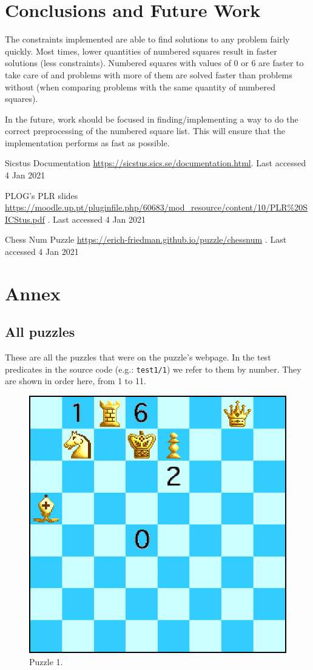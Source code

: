 \documentclass[runningheads]{llncs}
\newcommand{\inlinecode}[1]{\texttt{#1}}
\begin{document}
\section{Conclusions and Future Work}
The constraints implemented are able to find solutions to any problem fairly
quickly. Most times, lower quantities of numbered squares result in faster
solutions (less constraints). Numbered squares with values of 0 or 6 are
faster to take care of and problems with more of them are solved faster than
problems without (when comparing problems with the same quantity of numbered squares).

In the future, work should be focused in finding/implementing a way to do the
correct preprocessing of the numbered square list. This will ensure that the
implementation performs as fast as possible.

\begin{thebibliography}{8}
    Sicstus Documentation
        \href{https://sicstus.sics.se/documentation.html}{https://sicstus.sics.se/documentation.html}.
        Last accessed 4 Jan 2021

    PLOG's PLR slides 
    \href{https://moodle.up.pt/pluginfile.php/60683/mod\_resource/content/10/PLR\%20SICStus.pdf}{https://moodle.up.pt/pluginfile.php/60683/mod\_resource/content/10/PLR\%20SICStus.pdf}
    . Last accessed 4 Jan 2021

    Chess Num Puzzle 
    \href{https://erich-friedman.github.io/puzzle/chessnum}{https://erich-friedman.github.io/puzzle/chessnum}
    . Last accessed 4 Jan 2021
\end{thebibliography}

\section{Annex}
\subsection{All puzzles}
These are all the puzzles that were on the puzzle's webpage. In the test predicates in
the source code (e.g.: \inlinecode{test1/1}) we refer to them by number. They are shown
in order here, from 1 to 11.

\begin{figure}[H]
  \centering
  \includegraphics[width=0.6\linewidth]{figures/chessdemo.eps}
  \caption{Puzzle 1.}\label{fig:puzzle1}
\end{figure}
\end{document}
